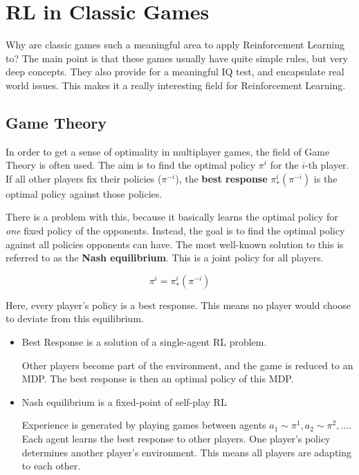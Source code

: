 \chapter{RL in Classic Games}

Why are classic games such a meaningful area to apply Reinforcement Learning to? The main point is that these games usually have quite simple rules, but very deep concepts. They also provide for a meaningful IQ test, and encapsulate real world issues. This makes it a really interesting field for Reinforcement Learning.

\section{Game Theory}

In order to get a sense of optimality in multiplayer games, the field of Game Theory is often used. The aim is to find the optimal policy $\pi^i$ for the $i$-th player. If all other players fix their policies ($\pi^{-i}$), the \textbf{best response} $\pi_*^i(\pi^{-i})$ is the optimal policy against those policies.

There is a problem with this, because it basically learns the optimal policy for \textit{one} fixed policy of the opponents. Instead, the goal is to find the optimal policy against all policies opponents can have. The most well-known solution to this is referred to as the \textbf{Nash equilibrium}. This is a joint policy for all players.

\begin{equation*}
	\pi^i = \pi_*^i(\pi^{-i})
\end{equation*}

Here, every player's policy is a best response. This means no player would choose to deviate from this equilibrium.

\begin{itemize}
	\item Best Response is a solution of a single-agent RL problem.
	
	Other players become part of the environment, and the game is reduced to an MDP. The best response is then an optimal policy of this MDP.
	
	\item Nash equilibrium is a fixed-point of self-play RL
	
	Experience is generated by playing games between agents $a_1 \sim \pi^1, a_2 \sim \pi^2, ...$. Each agent learns the best response to other players. One player's policy determines another player's environment. This means all players are adapting to each other.
\end{itemize}


